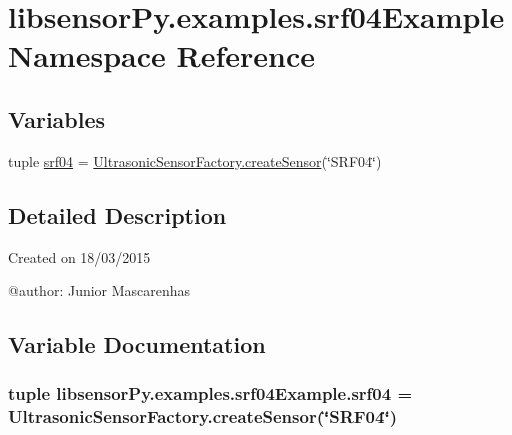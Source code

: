 \hypertarget{namespacelibsensorPy_1_1examples_1_1srf04Example}{}\section{libsensor\+Py.\+examples.\+srf04\+Example Namespace Reference}
\label{namespacelibsensorPy_1_1examples_1_1srf04Example}
\subsection*{Variables}
\begin{DoxyCompactItemize}
\item 
tuple \hyperlink{namespacelibsensorPy_1_1examples_1_1srf04Example_a34cddb77eda994303662e36c5c4dc510}{srf04} = \hyperlink{classconcretefactory_1_1ultrasonicSensorFactory_1_1UltrasonicSensorFactory_ade21ba1ce348eb9e5cf8eee3fda4a773}{Ultrasonic\+Sensor\+Factory.\+create\+Sensor}(\char`\"{}S\+R\+F04\char`\"{})
\end{DoxyCompactItemize}


\subsection{Detailed Description}
\begin{DoxyVerb}Created on 18/03/2015

@author: Junior Mascarenhas
\end{DoxyVerb}
 

\subsection{Variable Documentation}
\hypertarget{namespacelibsensorPy_1_1examples_1_1srf04Example_a34cddb77eda994303662e36c5c4dc510}{}
\subsubsection[{srf04}]{\setlength{\rightskip}{0pt plus 5cm}tuple libsensor\+Py.\+examples.\+srf04\+Example.\+srf04 = {\bf Ultrasonic\+Sensor\+Factory.\+create\+Sensor}(\char`\"{}S\+R\+F04\char`\"{})}\label{namespacelibsensorPy_1_1examples_1_1srf04Example_a34cddb77eda994303662e36c5c4dc510}
